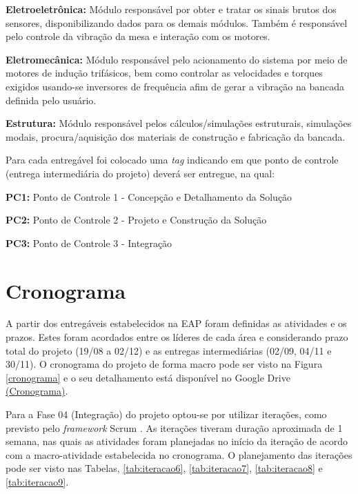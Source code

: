 \textbf{Eletroeletrônica:} Módulo responsável por obter e tratar os sinais brutos dos sensores, disponibilizando dados para os demais módulos. Também é responsável pelo controle da vibração da mesa e interação com os motores.

\textbf{Eletromecânica:} Módulo responsável pelo acionamento do sistema por meio de motores de indução trifásicos, bem como controlar as velocidades e torques exigidos usando-se inversores de frequência afim de gerar a vibração na bancada definida pelo usuário.

\textbf{Estrutura:} Módulo responsável pelos cálculos/simulações estruturais, simulações modais, procura/aquisição dos materiais de construção e fabricação da bancada.

Para cada entregável foi colocado uma \textit{tag} indicando em que ponto de controle (entrega intermediária do projeto) deverá ser entregue, na qual:

\indent \textbf{PC1:} Ponto de Controle 1 - Concepção e Detalhamento da Solução

\indent \textbf{PC2:} Ponto de Controle 2 - Projeto e Construção da Solução

\indent \textbf{PC3:} Ponto de Controle 3 - Integração

\section*{Cronograma}

A partir dos entregáveis estabelecidos na EAP foram definidas as atividades e os prazos. Estes foram acordados entre os líderes de
cada área e considerando prazo total do projeto (19/08 a 02/12) e as entregas intermediárias (02/09, 04/11 e 30/11).
O cronograma do projeto de forma macro pode ser visto na Figura \ref{cronograma} e o seu detalhamento está disponível
no Google Drive \href{https://drive.google.com/file/d/0B28JW3Vcm0jLdElSSGNPcU4yVEU/view?usp=sharing}{(Cronograma)}.

Para a Fase 04 (Integração) do projeto optou-se por utilizar iterações, como previsto pelo
\textit{framework} Scrum \cite{scrum}.
As iterações tiveram duração aproximada de 1 semana,
nas quais as atividades foram planejadas no início da iteração de acordo
com a macro-atividade estabelecida no cronograma. O planejamento das iterações pode ser visto nas Tabelas, \ref{tab:iteracao6}, \ref{tab:iteracao7}, \ref{tab:iteracao8} e \ref{tab:iteracao9}.

